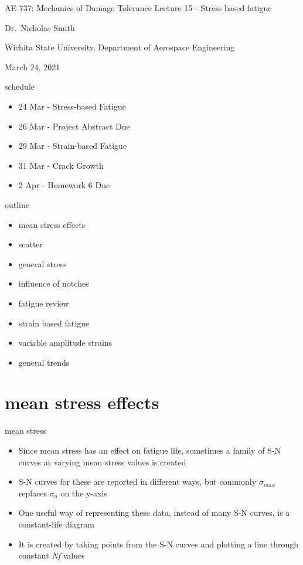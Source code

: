 \documentclass[
  letterpaper,
  ignorenonframetext,
  aspectratio=43,
  handout,
  12pt]{beamer}
\author{}
\date{}
\providecommand{\tightlist}{%
  \setlength{\itemsep}{0pt}\setlength{\parskip}{0pt}}
\providecommand{\tightlist}{%
\setlength{\itemsep}{0pt}\setlength{\parskip}{0pt}}
\begin{document}
\begin{frame}{AE 737: Mechanics of Damage Tolerance}
\protect\hypertarget{ae-737-mechanics-of-damage-tolerance}{}
Lecture 15 - Stress based fatigue

Dr.~Nicholas Smith

Wichita State University, Department of Aerospace Engineering

March 24, 2021
\end{frame}

\begin{frame}{schedule}
\protect\hypertarget{schedule}{}
\begin{itemize}
\tightlist
\item
  24 Mar - Stress-based Fatigue
\item
  26 Mar - Project Abstract Due
\item
  29 Mar - Strain-based Fatigue
\item
  31 Mar - Crack Growth
\item
  2 Apr - Homework 6 Due
\end{itemize}
\end{frame}

\begin{frame}{outline}
\protect\hypertarget{outline}{}
\begin{itemize}
\tightlist
\item
  mean stress effects
\item
  scatter
\item
  general stress
\item
  influence of notches
\item
  fatigue review
\item
  strain based fatigue
\item
  variable amplitude strains
\item
  general trends
\end{itemize}
\end{frame}

\hypertarget{mean-stress-effects}{%
\section{mean stress effects}\label{mean-stress-effects}}

\begin{frame}{mean stress}
\protect\hypertarget{mean-stress}{}
\begin{itemize}
\tightlist
\item
  Since mean stress has an effect on fatigue life, sometimes a family of
  S-N curves at varying mean stress values is created
\item
  S-N curves for these are reported in different ways, but commonly
  \(\sigma_{max}\) replaces \(\sigma_a\) on the y-axis
\item
  One useful way of representing these data, instead of many S-N curves,
  is a constant-life diagram
\item
  It is created by taking points from the S-N curves and plotting a line
  through constant \emph{N}\emph{f} values
\end{itemize}
\end{frame}
\end{document}
